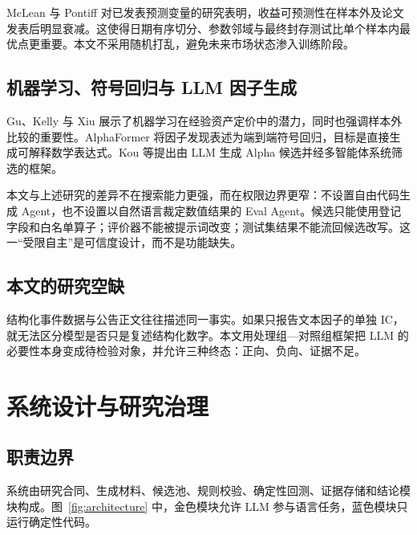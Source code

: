 \documentclass[UTF8,zihao=-4]{ctexart}
\theoremstyle{accentthm}
\begin{document}
McLean 与 Pontiff 对已发表预测变量的研究表明，收益可预测性在样本外及论文发表后明显衰减\cite{mclean2016}。这使得日期有序切分、参数邻域与最终封存测试比单个样本内最优点更重要。本文不采用随机打乱，避免未来市场状态渗入训练阶段。

\subsection{机器学习、符号回归与 LLM 因子生成}

Gu、Kelly 与 Xiu 展示了机器学习在经验资产定价中的潜力，同时也强调样本外比较的重要性\cite{gkx2020}。AlphaFormer 将因子发现表述为端到端符号回归，目标是直接生成可解释数学表达式\cite{alphaformer2026}。Kou 等提出由 LLM 生成 Alpha 候选并经多智能体系统筛选的框架\cite{kou2025}。

本文与上述研究的差异不在搜索能力更强，而在权限边界更窄：不设置自由代码生成 Agent，也不设置以自然语言裁定数值结果的 Eval Agent。候选只能使用登记字段和白名单算子；评价器不能被提示词改变；测试集结果不能流回候选改写。这一“受限自主”是可信度设计，而不是功能缺失。

\subsection{本文的研究空缺}

结构化事件数据与公告正文往往描述同一事实。如果只报告文本因子的单独 IC，就无法区分模型是否只是复述结构化数字。本文用处理组—对照组框架把 LLM 的必要性本身变成待检验对象，并允许三种终态：正向、负向、证据不足。

\section{系统设计与研究治理}\label{sec:system}

\subsection{职责边界}

系统由研究合同、生成材料、候选池、规则校验、确定性回测、证据存储和结论模块构成。图~\ref{fig:architecture} 中，金色模块允许 LLM 参与语言任务，蓝色模块只运行确定性代码。
\end{document}
